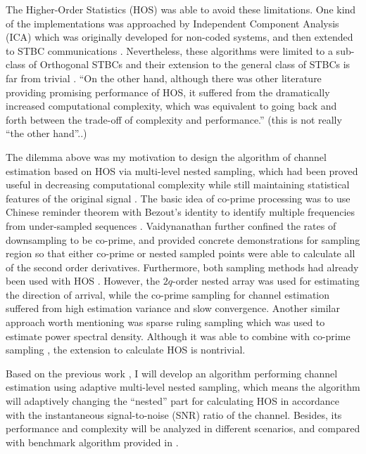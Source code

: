 \documentclass[letterpaper,10pt]{article}
\begin{document}
The Higher-Order Statistics (HOS) \cite{Mendel:1991} was able to avoid these limitations. One kind of the implementations was approached by Independent Component Analysis (ICA) \cite{Hyvarinen:2001} which was originally developed for non-coded systems, and then extended to STBC communications \cite{Iglesias:2008}. Nevertheless, these algorithms were limited to a sub-class of Orthogonal STBCs and their extension to the general class of STBCs is far from trivial \cite{Iglesias:2008}. ``On the other hand, although there was other literature providing promising performance \cite{Choqueuse:2011} of HOS, it suffered from the dramatically increased computational complexity, which was equivalent to going back and forth between the trade-off of complexity and performance.'' (this is not really ``the other hand''..)

The dilemma above was my motivation to design the algorithm of channel estimation based on HOS via multi-level nested sampling, which had been proved useful in decreasing computational complexity while still maintaining statistical features of the original signal \cite{Pal:2010}. The basic idea of co-prime processing was to use Chinese reminder theorem with Bezout's identity to identify multiple frequencies from under-sampled sequences \cite{Xia:1999}. Vaidynanathan \cite{Vaidynanathan1:2011} further confined the rates of downsampling to be co-prime, and  provided concrete demonstrations for sampling region so that either co-prime or nested sampled points were able to calculate all of the second order derivatives. Furthermore, both sampling methods had already been used with HOS \cite{Pal:2012, Wu:2014}. However, the $2q$-order nested array was used for estimating the direction of arrival, while the co-prime sampling for channel estimation suffered from high estimation variance and slow convergence. Another similar approach worth mentioning was sparse ruling sampling \cite{Ariananda:2012} which was used to estimate power spectral density. Although it was able to combine with co-prime sampling \cite{Dominguez:2013}, the extension to calculate HOS is nontrivial.

Based on the previous work \cite{Wu:2014}, I will develop an algorithm performing channel estimation using adaptive multi-level nested sampling, which means the algorithm will adaptively changing the ``nested'' part for calculating HOS in accordance with the instantaneous signal-to-noise (SNR) ratio of the channel. Besides, its performance and complexity will be analyzed in different scenarios, and compared with benchmark algorithm provided in \cite{Choqueuse:2011}.
\end{document}
